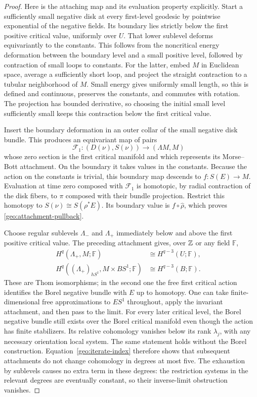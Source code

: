 \begin{proof}
Here is the attaching map and its evaluation property explicitly.
Start a sufficiently small negative disk at every first-level
geodesic by pointwise exponential of the negative fields.  Its
boundary lies strictly below the first positive critical value,
uniformly over $U$.  That lower sublevel deforms equivariantly to
the constants.  This follows from the noncritical energy
deformation between the boundary level and a small positive
level, followed by contraction of small loops to constants.  For
the latter, embed $M$ in Euclidean space, average a sufficiently
short loop, and project the straight contraction to a tubular
neighborhood of $M$.  Small energy gives uniformly small length,
so this is defined and continuous, preserves the constants, and
commutes with rotation.  The projection has bounded derivative,
so choosing the initial small level sufficiently small keeps this
contraction below the first critical value.

Insert the boundary deformation in an outer collar of the small
negative disk bundle.  This produces an equivariant map of pairs
\[
 \mathcal F_1:(D(\nu),S(\nu))\longrightarrow(\Lambda M,M)
\]
whose zero section is the first critical manifold and which
represents its Morse--Bott attachment.  On the boundary it takes
values in the constants.  Because the action on the constants
is trivial, this boundary map descends to
$f:S(E)\to M$.  Evaluation at time zero composed with
$\mathcal F_1$ is homotopic, by radial contraction of the disk
fibers, to $\pi$ composed with their bundle projection.  Restrict
this homotopy to $S(\nu)\cong S(\rho^*E)$.  Its boundary value
is $f\circ\widehat\rho$, which proves
\eqref{geo:attachment-pullback}.

Choose regular sublevels $\Lambda_-$ and $\Lambda_+$ immediately
below and above the first positive critical value.  The preceding
attachment gives, over $\mathbb Z$ or any field $\mathbb F$,
\begin{align}
 H^q(\Lambda_+,M;\mathbb F)
     &\cong H^{q-3}(U;\mathbb F),
       \label{geo:ordinary-relative}\\
 H^q((\Lambda_+)_{hS^1},M\times BS^1;\mathbb F)
     &\cong H^{q-3}(B;\mathbb F).
       \label{geo:borel-relative}
\end{align}
These are Thom isomorphisms; in the second one the free first
critical action identifies the Borel negative bundle with $E$
up to homotopy.  One can take finite-dimensional free
approximations to $ES^1$ throughout, apply the invariant
attachment, and then pass to the limit.
For every later critical level, the Borel negative bundle still
exists over the Borel critical manifold even though the action
has finite stabilizers.  Its relative cohomology vanishes below
its rank $\lambda_j$, with any necessary orientation local
system.  The same statement holds without the Borel construction.
Equation~\eqref{geo:iterate-index} therefore shows that subsequent
attachments do not change cohomology in degrees at most five.
The exhaustion by sublevels causes no extra term in these degrees:
the restriction systems in the relevant degrees are eventually
constant, so their inverse-limit obstruction vanishes.


\end{proof}
